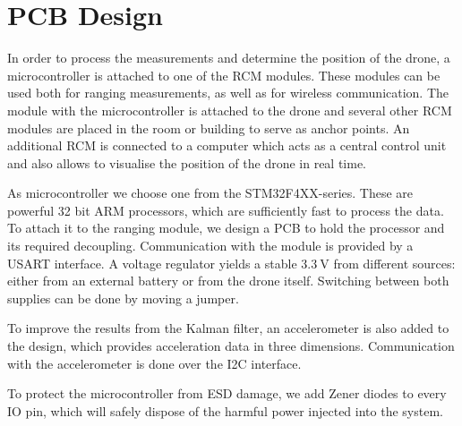 \documentclass[a4paper]{article}        %
\begin{document}
\section{PCB Design}
  In order to process the measurements and determine the position of the drone, a microcontroller is attached to one of the RCM modules.
  These modules can be used both for ranging measurements, as well as for wireless communication. The module with the microcontroller is attached to the drone and several other RCM modules are placed in the room or building to serve as anchor points. An additional RCM is connected to a computer which acts as a central control unit and also allows to visualise the position of the drone in real time.

  As microcontroller we choose one from the STM32F4XX-series. These are powerful 32 bit ARM processors, which are sufficiently fast to process the data.
  To attach it to the ranging module, we design a PCB to hold the processor and its required decoupling. Communication with the module is provided by a USART interface.
  A voltage regulator yields a stable $\SI{3.3}{\volt}$ from different sources: either from an external battery or from the drone itself. Switching between both supplies can be done by moving a jumper.

  To improve the results from the Kalman filter, an accelerometer is also added to the design, which provides acceleration data in three dimensions. Communication with the accelerometer is done over the I2C interface.

  To protect the microcontroller from ESD damage, we add Zener diodes to every IO pin, which will safely dispose of the harmful power injected into the system.

  
\end{document}
